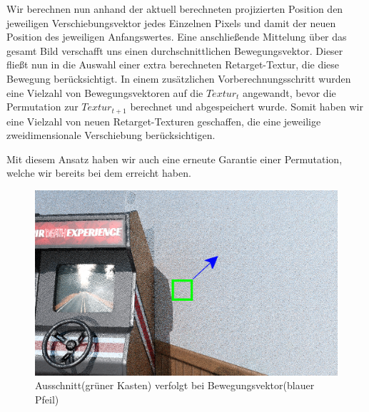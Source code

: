 Wir berechnen nun anhand der aktuell berechneten projizierten Position den jeweiligen Verschiebungsvektor jedes Einzelnen 
Pixels und damit der neuen Position des jeweiligen Anfangswertes. Eine anschließende Mittelung über das gesamt Bild verschafft 
uns einen durchschnittlichen Bewegungsvektor. Dieser fließt nun in die Auswahl einer extra berechneten Retarget-Textur, die diese
Bewegung berücksichtigt. In einem zusätzlichen Vorberechnungsschritt wurden eine Vielzahl von Bewegungsvektoren auf die 
 $Textur_{t}$ angewandt, bevor die Permutation zur $Textur_{t+1}$ berechnet und abgespeichert
wurde. Somit haben wir eine Vielzahl von neuen Retarget-Texturen geschaffen, die eine jeweilige zweidimensionale Verschiebung 
berücksichtigen.
\par 
Mit diesem Ansatz haben wir auch eine erneute Garantie einer Permutation, welche wir bereits bei dem 
erreicht haben.
\newpage

  \begin{figure}[H]
    \begin{tcolorbox}
    \centering
    \includegraphics[width=0.5\linewidth]{content/TemporalerAlg/Bilder/Reprojection/Szene_bearbeitet.png}
    \end{tcolorbox}
    \caption{Ausschnitt(grüner Kasten) verfolgt bei Bewegungsvektor(blauer Pfeil)}
    \label{pic:TemporalReprComparison}
  \end{figure}


